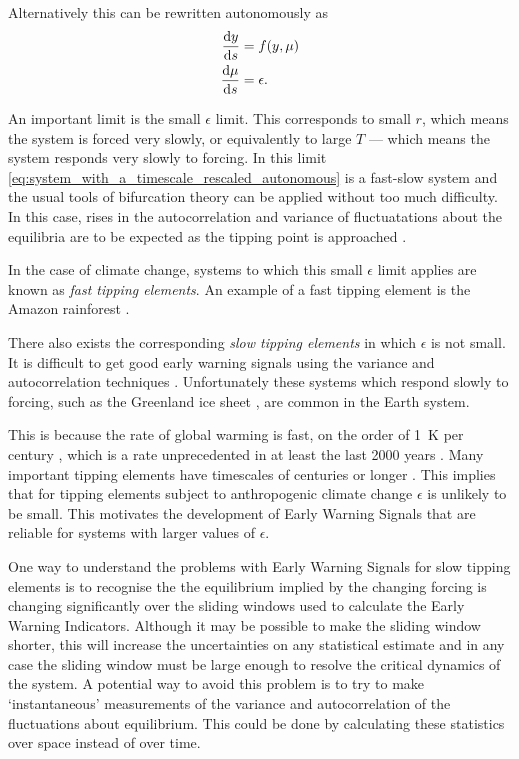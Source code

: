 Alternatively this can be rewritten autonomously as
\begin{subequations}
  \label{eq:system_with_a_timescale_rescaled_autonomous}
  \begin{align}
    \dv{y}{s} &= f(y,\mu) \\
    \dv{\mu}{s} &= \epsilon.
  \end{align}
\end{subequations}

An important limit  is the small $\epsilon$ limit. This corresponds to small $r$, which means the system is forced very slowly, or equivalently to
large $T$ --- which means the system responds very slowly to forcing. In this limit \cref{eq:system_with_a_timescale_rescaled_autonomous} is a
fast-slow system \parencite{Kuehn2011} and the usual tools of bifurcation theory can be applied without too much difficulty. In this case,
rises in the autocorrelation and variance of fluctuatations about the equilibria are to be expected as the tipping point is approached  \parencite{Scheffer2009}.

In the case of climate change, systems to which this small $\epsilon$ limit applies are known as \emph{fast tipping elements}. An example of a fast tipping element is
the Amazon rainforest \parencite{Ritchie2020}.

There also exists the corresponding \emph{slow tipping elements} in which $\epsilon$ is not small. It is difficult to get good early warning signals
using the variance and autocorrelation techniques \parencite{VanderBolt2021}. Unfortunately these systems which respond slowly to forcing, such as the Greenland ice
sheet \parencite{Richie2020}, are common in the Earth system.

This is because the rate of global warming is fast, on the order of \SI{1}{\kelvin} per century \parencite{Osborn2021}, which is a rate unprecedented in at least
the last 2000 years \parencite{AR6}. Many important tipping elements have timescales of centuries or longer \parencite{Lenton2008,ArmstrongMcKay2022}.
This implies that for tipping elements subject to anthropogenic climate change $\epsilon$ is unlikely to be small. This motivates the development of Early Warning Signals that are reliable
for systems with larger values of $\epsilon$. 

One way to understand the problems with Early Warning Signals for slow tipping elements is to recognise the the equilibrium implied by the changing forcing is changing
significantly over the sliding windows used to calculate the Early Warning Indicators. Although it may be possible to make the sliding window shorter, this will
increase the uncertainties on any statistical estimate and in any case the sliding window must be large enough to resolve the critical dynamics of the system.
A potential way to avoid this problem is to try to make `instantaneous' measurements of the variance and autocorrelation of the fluctuations about equilibrium.
This could be done by calculating these statistics over space instead of over time.

